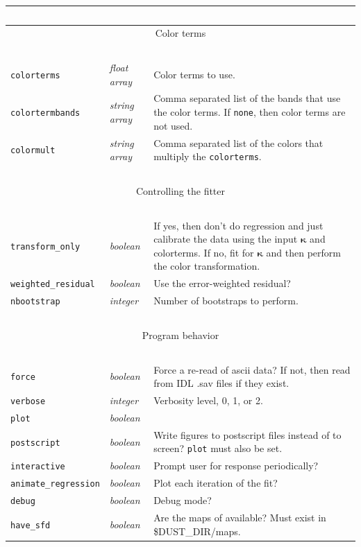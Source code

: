 \documentclass{report}
\newcommand{\zptcolor}{\boldsymbol{\kappa}}
\begin{document}
\begin{center}
\begin{longtable}{llp{2in}}
~ & ~ & ~ \\ \hline
\multicolumn{3}{c}{Color terms} \\
\hline ~ & ~ & ~ \\ 

\verb|colorterms| & {\it float array} & Color terms to use. \\
\verb|colortermbands| & {\it string array} & Comma separated list of the bands that use the color terms. If {\tt none}, then color terms are not used. \\
\verb|colormult| & {\it string array} & Comma separated list of the colors that multiply the \verb|colorterms|. \\

~ & ~ & ~ \\ \hline
\multicolumn{3}{c}{Controlling the fitter} \\
\hline ~ & ~ & ~ \\ 

\verb|transform_only| & {\it boolean} & If yes, then don't do regression and just calibrate the data using the input $\zptcolor$ and colorterms.  If no, fit for $\zptcolor$ and then perform the color transformation. \\
\verb|weighted_residual| & {\it boolean} & Use the error-weighted residual? \\
\verb|nbootstrap| & {\it integer} & Number of bootstraps to perform. \\

~ & ~ & ~ \\ \hline
\multicolumn{3}{c}{Program behavior} \\
\hline ~ & ~ & ~ \\ 

\verb|force| & {\it boolean} & Force a re-read of ascii data? If not, then read from IDL .sav files if they exist.  \\
\verb|verbose| & {\it integer} & Verbosity level, 0, 1, or 2.  \\
\verb|plot| & {\it boolean} &  \\
\verb|postscript| & {\it boolean} & Write figures to postscript files instead of to screen? \verb|plot| must also be set.  \\
\verb|interactive| & {\it boolean} & Prompt user for response periodically? \\
\verb|animate_regression| & {\it boolean} & Plot each iteration of the fit? \\
\verb|debug| & {\it boolean} & Debug mode? \\
\verb|have_sfd| & {\it boolean} & Are the maps of \citet{bib:sfd} available? Must exist in \$DUST\_DIR/maps. \\



\end{longtable}
\end{center}
\end{document}
